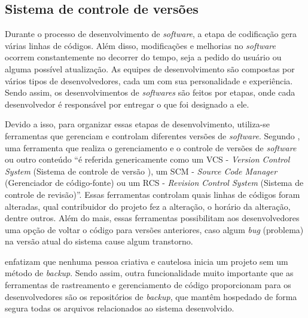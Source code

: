 \subsection{{Sistema de controle de versões}}

Durante o processo de desenvolvimento de \textit{software}, a etapa de codificação gera várias linhas de códigos. Além disso, modificações e melhorias no \textit{software} ocorrem constantemente no decorrer do tempo, seja a pedido do usuário ou alguma possível atualização.  As equipes de desenvolvimento são compostas por vários tipos de desenvolvedores, cada um com sua personalidade e experiência. Sendo assim, os desenvolvimentos de \textit{softwares} são feitos por etapas, onde cada desenvolvedor é responsável por entregar o que foi designado a ele. 

Devido a isso, para organizar essas etapas de desenvolvimento, utiliza-se ferramentas que gerenciam e controlam diferentes versões de \textit{software}.  Segundo ,  uma ferramenta que realiza o gerenciamento e o controle de versões de \textit{software} ou outro conteúdo “é referida genericamente como um VCS - \textit{Version Control System} (Sistema de controle de versão ), um SCM - \textit{Source Code Manager} (Gerenciador de código-fonte) ou um RCS - \textit{Revision Control System} (Sistema de controle de revisão)”. Essas ferramentas controlam quais linhas de códigos foram alteradas, qual contribuidor do projeto fez a alteração, o horário da alteração, dentre outros. Além do mais, essas ferramentas possibilitam aos desenvolvedores uma opção de voltar o código para versões anteriores, caso algum \textit{bug} (problema) na versão atual do sistema cause algum transtorno.

 enfatizam que nenhuma pessoa criativa e cautelosa inicia um projeto sem um método de \textit{backup}. Sendo assim, outra funcionalidade muito importante que as ferramentas de rastreamento e gerenciamento de código proporcionam para os desenvolvedores são os repositórios de \textit{backup}, que mantêm hospedado de forma segura todas os arquivos relacionados ao sistema desenvolvido.



